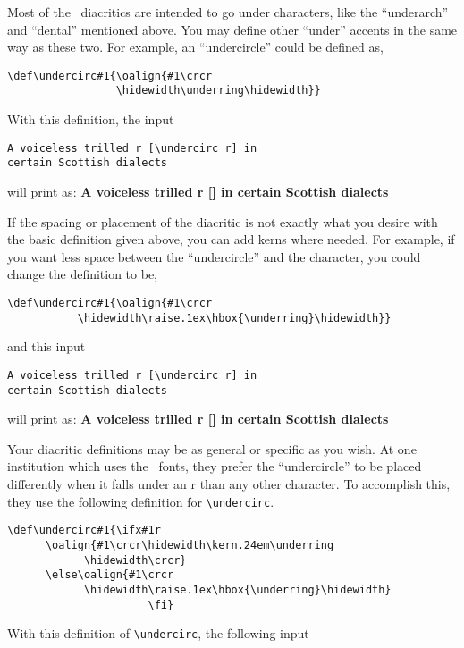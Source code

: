 Most of the \wsu\ diacritics are intended to go under characters, like the
``underarch'' and ``dental'' mentioned above. You may define other ``under''
accents in the same way as these two. For example, an ``undercircle''
could be defined as,

\begin{verbatim}
\def\undercirc#1{\oalign{#1\crcr
                 \hidewidth\underring\hidewidth}}
\end{verbatim}
\noindent With this definition, the input
\begin{verbatim}
A voiceless trilled r [\undercirc r] in
certain Scottish dialects
\end{verbatim}
\noindent will print as:
\vs{5pt}
{\def\undercirc#1{\oalign{#1\crcr\hidewidth\underring\hidewidth}}
\bf A voiceless trilled r [\undercirc r] in certain Scottish dialects
}
\vs{5pt}

If the spacing or placement of the diacritic is not exactly what you desire
with the basic definition given above, you can add kerns where needed.
For example, if you want less space between the ``undercircle'' and
the character, you could change the definition to be,
\begin{verbatim}
\def\undercirc#1{\oalign{#1\crcr
           \hidewidth\raise.1ex\hbox{\underring}\hidewidth}}
\end{verbatim}

\noindent and this input
\begin{verbatim}
A voiceless trilled r [\undercirc r] in
certain Scottish dialects
\end{verbatim}
\noindent will print as:
\vs{5pt}
{\def\undercirc#1{\oalign{#1\crcr\hidewidth
\raise.1ex\hbox{\underring}\hidewidth}}
\bf A voiceless trilled r [\undercirc r] in certain Scottish dialects
}
\vs{5pt}

Your diacritic definitions may be as general or specific as you wish. At one
institution which uses the \wsu\ fonts, they prefer the ``undercircle'' to be
placed differently when it falls under an r than any other character. To
accomplish this, they use the following definition for \verb?\undercirc?.

\begin{verbatim}
\def\undercirc#1{\ifx#1r
      \oalign{#1\crcr\hidewidth\kern.24em\underring
            \hidewidth\crcr}
      \else\oalign{#1\crcr
            \hidewidth\raise.1ex\hbox{\underring}\hidewidth}
                      \fi}
\end{verbatim}

With this definition of \verb?\undercirc?, the following input

